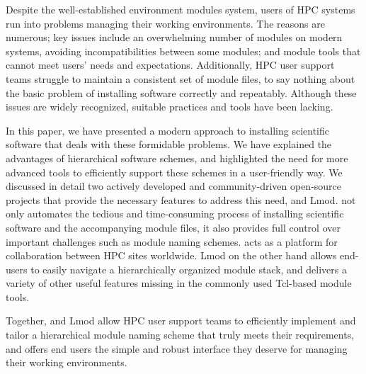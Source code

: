 Despite the well-established environment modules system, users of HPC systems run into problems managing their working environments. The reasons are numerous; key issues
include an overwhelming
number of modules on modern systems, avoiding incompatibilities between some modules; and
module tools that cannot meet users' needs and expectations. Additionally, HPC
user support teams struggle to maintain a consistent set of module files, to say nothing about the basic problem of installing software correctly and repeatably.
Although these issues are widely recognized, suitable practices and tools
have been lacking.

In this paper, we have presented a modern approach to installing scientific software that
deals with these formidable problems. We have explained the 
advantages of hierarchical software schemes, and highlighted the need
for more advanced tools to efficiently support these schemes in a
user-friendly way. We discussed in detail two actively developed and community-driven open-source projects
that provide the necessary features to address this need, \easybuild{} and Lmod. \easybuild{} not only automates the tedious and time-consuming
process of installing scientific software and the accompanying module files, it also
provides full control over important challenges such as  module naming schemes. \easybuild{} acts as a platform for collaboration between HPC sites worldwide. Lmod on the
other hand allows end-users to easily navigate a hierarchically organized module
stack, and delivers a variety of other useful features missing in the
commonly used Tcl-based module tools.

Together, \easybuild{} and Lmod allow HPC user support teams to efficiently implement and tailor a
hierarchical module naming scheme that truly meets their 
requirements, and offers
end users the simple and robust interface they deserve for managing their working
environments.
